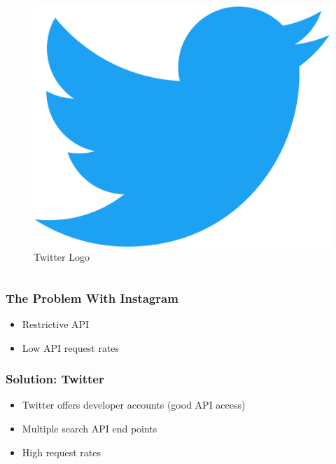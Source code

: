\documentclass[pdf]{beamer}
\begin{document}
\begin{frame}
\begin{columns}
\begin{column}{0.5\textwidth}
\begin{figure}[ht]
        \includegraphics[width=\linewidth]{figures/twitter_logo.jpeg}
        \caption{\label{fig:t_logo} Twitter Logo}
      \end{figure}
    \end{column}
  \end{columns}
  
\end{frame}

\begin{frame}
  \frametitle{The Problem With Instagram}
  \begin{itemize}
  \item Restrictive API

  \item Low API request rates

  \end{itemize}
\end{frame}

\begin{frame}
  \frametitle{Solution: Twitter}
  \begin{itemize}
  \item Twitter offers developer accounts (good API access)

  \item Multiple search API end points

  \item High request rates 

  \end{itemize}
\end{frame}
\end{document}
